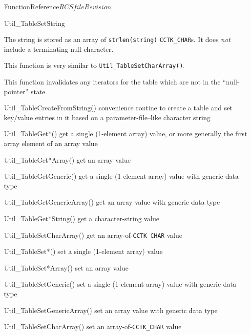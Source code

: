 \begin{cactuspart}{FunctionReference}{$RCSfile$}{$Revision$}
\begin{FunctionDescription}{Util\_TableSetString}
\begin{Discussion}
The string is stored as an array of \verb|strlen(string)|
\verb|CCTK_CHAR|s.  It does {\em not\/} include a terminating
null character.

This function is very similar to \verb|Util_TableSetCharArray()|.

This function invalidates any iterators for the table which are
not in the ``null-pointer'' state.
\end{Discussion}

\begin{SeeAlsoSection}
\begin{SeeAlso}{Util\_TableCreateFromString()}
convenience routine to create a table and set key/value entries
in it based on a parameter-file--like character string
\end{SeeAlso}
\begin{SeeAlso}{Util\_TableGet*()}
get a single (1-element array) value,
or more generally the first array element of an array value
\end{SeeAlso}
\begin{SeeAlso}{Util\_TableGet*Array()}
get an array value
\end{SeeAlso}
\begin{SeeAlso}{Util\_TableGetGeneric()}
get a single (1-element array) value with generic data type
\end{SeeAlso}
\begin{SeeAlso}{Util\_TableGetGenericArray()}
get an array value with generic data type
\end{SeeAlso}
\begin{SeeAlso}{Util\_TableGet*String()}
get a character-string value
\end{SeeAlso}
\begin{SeeAlso}{Util\_TableSetCharArray()}
get an array-of-\verb|CCTK_CHAR| value
\end{SeeAlso}
\begin{SeeAlso}{Util\_TableSet*()}
set a single (1-element array) value
\end{SeeAlso}
\begin{SeeAlso}{Util\_TableSet*Array()}
set an array value
\end{SeeAlso}
\begin{SeeAlso}{Util\_TableSetGeneric()}
set a single (1-element array) value with generic data type
\end{SeeAlso}
\begin{SeeAlso}{Util\_TableSetGenericArray()}
set an array value with generic data type
\end{SeeAlso}
\begin{SeeAlso}{Util\_TableSetCharArray()}
set an array-of-\verb|CCTK_CHAR| value
\end{SeeAlso}
\end{SeeAlsoSection}


\end{FunctionDescription}
\end{cactuspart}
